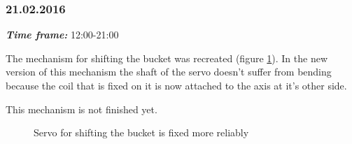 \subsubsection{21.02.2016}
\textit{\textbf{Time frame:}} 12:00-21:00 

The mechanism for shifting the bucket was recreated (figure \ref{Shiftbuc2.8}). In the new version of this mechanism the shaft of the servo doesn't suffer from bending because the coil that is fixed on it is now attached to the axis at it's other side. 

This mechanism is not finished yet.

\begin{figure}[H]
	\begin{minipage}[h]{1\linewidth}
		\caption{Servo for shifting the bucket is fixed more reliably}
		\label{Shiftbuc2.8}
	\end{minipage}
\end{figure}
